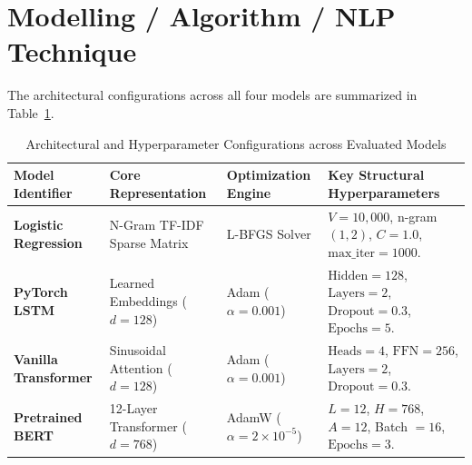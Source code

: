 \documentclass[12pt,a4paper]{report}
\begin{document}
\section{Modelling / Algorithm / NLP Technique}
The architectural configurations across all four models are summarized in Table~\ref{tab:exp7_model_arch}.
\begin{table}[H]
\centering
\small
\caption{Architectural and Hyperparameter Configurations across Evaluated Models}
\label{tab:exp7_model_arch}
\begin{tabularx}{\textwidth}{lp{3.5cm}p{3cm}X}
\toprule
\textbf{Model Identifier} & \textbf{Core Representation} & \textbf{Optimization Engine} & \textbf{Key Structural Hyperparameters} \\
\midrule
\textbf{Logistic Regression} & N-Gram TF-IDF Sparse Matrix & L-BFGS Solver & $V = 10,000$, n-gram $(1, 2)$, $C = 1.0$, $\text{max\_iter} = 1000$. \\
\textbf{PyTorch LSTM} & Learned Embeddings ($d=128$) & Adam ($\alpha = 0.001$) & $\text{Hidden} = 128$, $\text{Layers} = 2$, $\text{Dropout} = 0.3$, $\text{Epochs} = 5$. \\
\textbf{Vanilla Transformer} & Sinusoidal Attention ($d=128$) & Adam ($\alpha = 0.001$) & $\text{Heads} = 4$, $\text{FFN} = 256$, $\text{Layers} = 2$, $\text{Dropout} = 0.3$. \\
\textbf{Pretrained BERT} & 12-Layer Transformer ($d=768$) & AdamW ($\alpha = 2\times 10^{-5}$) & $L = 12$, $H = 768$, $A = 12$, Batch $= 16$, $\text{Epochs} = 3$. \\
\bottomrule
\end{tabularx}
\end{table}
\end{document}
